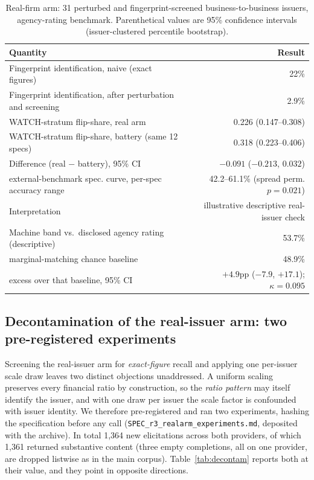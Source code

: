 \documentclass[a4paper,fleqn]{cas-sc}
\begin{document}
\begin{table}[t]\centering
\caption{Real-firm arm: 31 perturbed and fingerprint-screened business-to-business issuers, agency-rating benchmark.
Parenthetical values are 95\% confidence intervals (issuer-clustered percentile bootstrap).}
\label{tab:realarm}
\begin{tabular}{lr}\toprule
Quantity & Result \\\midrule
Fingerprint identification, naive (exact figures) & 22\% \\
Fingerprint identification, after perturbation and screening & 2.9\% \\
WATCH-stratum flip-share, real arm & 0.226 (0.147--0.308) \\
WATCH-stratum flip-share, battery (same 12 specs) & 0.318 (0.223--0.406) \\
Difference (real $-$ battery), 95\% CI & $-0.091$ ($-0.213$, $0.032$) \\
external-benchmark spec. curve, per-spec accuracy range & 42.2--61.1\% (spread perm. $p=0.021$) \\
Interpretation & illustrative descriptive real-issuer check \\
Machine band vs.\ disclosed agency rating (descriptive) & 53.7\% \\
\quad marginal-matching chance baseline & 48.9\% \\
\quad excess over that baseline, 95\% CI & $+4.9$pp ($-7.9$, $+17.1$); $\kappa=0.095$ \\\bottomrule
\end{tabular}\end{table}

\subsection{Decontamination of the real-issuer arm: two pre-registered experiments}
\label{sec:decontam}
Screening the real-issuer arm for \emph{exact-figure} recall and applying one per-issuer scale draw leaves two distinct objections unaddressed. A uniform scaling preserves
every financial ratio by construction, so the \emph{ratio pattern} may itself identify the issuer,
and with one draw per issuer the scale factor is confounded with issuer identity. We therefore
pre-registered and ran two experiments, hashing the specification before any call
(\texttt{SPEC\_r3\_realarm\_experiments.md}, deposited with the archive). In total 1{,}364 new elicitations across
both providers, of which 1{,}361 returned substantive content (three empty completions, all on one
provider, are dropped listwise as in the main corpus). Table~\ref{tab:decontam} reports both at their value, and they point in opposite
directions.
\end{document}
